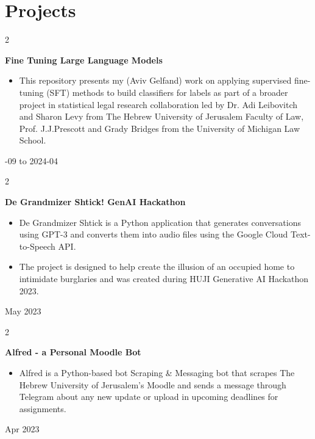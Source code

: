 \documentclass[10pt, letterpaper]{article}
\newenvironment{highlights}{
    \begin{itemize}[
        topsep=0.10 cm,
        parsep=0.10 cm,
        partopsep=0pt,
        itemsep=0pt,
        leftmargin=0.4 cm + 10pt
    ]
}{
    \end{itemize}
} %
\newenvironment{twocolentry}[2][]{
    \onecolentry
    \def\secondColumn{#2}
    \setcolumnwidth{\fill, 4.5 cm}
    \begin{paracol}{2}
}{
    \switchcolumn \raggedleft \secondColumn
    \end{paracol}
    \endonecolentry
} %
\begin{document}
    
    \section{Projects}



        
        \begin{twocolentry}{
            2023-09 to 2024-04
        }
            \textbf{Fine Tuning Large Language Models}
            \begin{highlights}
                \item This repository presents my (Aviv Gelfand) work on applying supervised fine-tuning (SFT) methods to build classifiers for labels as part of a broader project in statistical legal research collaboration led by Dr. Adi Leibovitch and Sharon Levy from The Hebrew University of Jerusalem Faculty of Law, Prof. J.J.Prescott and Grady Bridges from the University of Michigan Law School.
            \end{highlights}
        \end{twocolentry}


        \vspace{0.2 cm}

        \begin{twocolentry}{
            May 2023
        }
            \textbf{De Grandmizer Shtick! GenAI Hackathon}
            \begin{highlights}
                \item De Grandmizer Shtick is a Python application that generates conversations using GPT-3 and converts them into audio files using the Google Cloud Text-to-Speech API.
                \item The project is designed to help create the illusion of an occupied home to intimidate burglaries and was created during HUJI Generative AI Hackathon 2023.
            \end{highlights}
        \end{twocolentry}


        \vspace{0.2 cm}

        \begin{twocolentry}{
            Apr 2023
        }
            \textbf{Alfred - a Personal Moodle Bot}
            \begin{highlights}
                \item Alfred is a Python-based bot Scraping \& Messaging bot that scrapes The Hebrew University of Jerusalem's Moodle and sends a message through Telegram about any new update or upload in upcoming deadlines for assignments.
            \end{highlights}
        \end{twocolentry}
\end{document}
